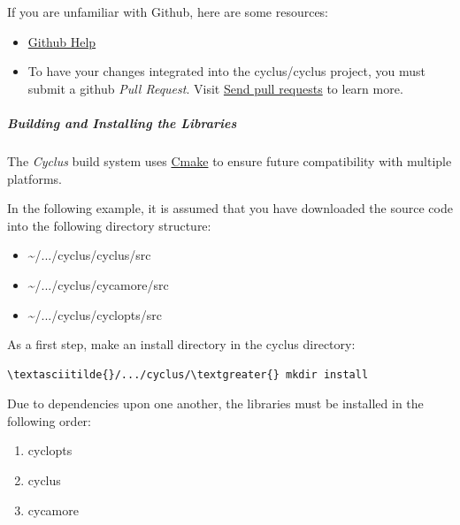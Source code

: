 \documentclass[letterpaper,10pt,english]{sphinxmanual}
\begin{document}
If you are unfamiliar with Github, here are some resources:
\begin{itemize}
\item {} 
\href{http://help.github.com}{Github Help}

\item {} 
To have your changes integrated into the cyclus/cyclus project, you must
submit a github \emph{Pull Request}.  Visit \href{http://help.github.com/send-pull-requests/}{Send pull requests} to learn more.

\end{itemize}


\subparagraph{Building and Installing the Libraries}
\label{devdoc/get_and_build:send-pull-requests}\label{devdoc/get_and_build:building-and-installing-the-libraries}
The \emph{Cyclus} build system uses \href{http://www.cmake.orgCmake}{Cmake}
to ensure future compatibility with multiple platforms.

In the following example, it is assumed that you have downloaded the
source code into the following directory structure:
\begin{itemize}
\item {} 
\textasciitilde{}/.../cyclus/cyclus/src

\item {} 
\textasciitilde{}/.../cyclus/cycamore/src

\item {} 
\textasciitilde{}/.../cyclus/cyclopts/src

\end{itemize}

As a first step, make an install directory in the cyclus directory:

\begin{Verbatim}[commandchars=\\\{\}]
\textasciitilde{}/.../cyclus/\textgreater{} mkdir install
\end{Verbatim}

Due to dependencies upon one another, the libraries must be installed
in the following order:
\begin{enumerate}
\item {} 
cyclopts

\item {} 
cyclus

\item {} 
cycamore

\end{enumerate}
\end{document}
